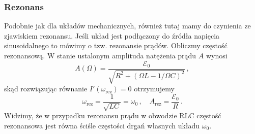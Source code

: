 \documentclass[../main.tex]{subfiles}
\begin{document}
\subsubsection*{Rezonans}
Podobnie jak dla układów mechanicznych, również tutaj mamy do czynienia ze zjawiskiem rezonansu.
Jeśli układ jest podłączony do źródła napięcia sinusoidalnego to mówimy o tzw. rezonansie prądów.
Obliczmy częstość rezonansową. W stanie ustalonym amplituda natężenia prądu \(A\) wynosi
\begin{equation*}
    A(\Omega)=\frac{\mathcal{E}_0}{\sqrt{R^2+(\Omega L-1/\Omega C)^2}}\,,
\end{equation*}
skąd rozwiązując równanie \(I'(\omega_\text{rez})=0\) otrzymujemy
\begin{equation*}
    \omega_\text{rez}=\frac{1}{\sqrt{LC}}=\omega_0\,,\quad A_\text{rez}=\frac{\mathcal{E}_0}{R}\,.
\end{equation*}
Widzimy, że w przypadku rezonansu prądu w obwodzie RLC częstość rezonansowa jest równa ściśle
częstości drgań własnych układu \(\omega_0\).
\end{document}
